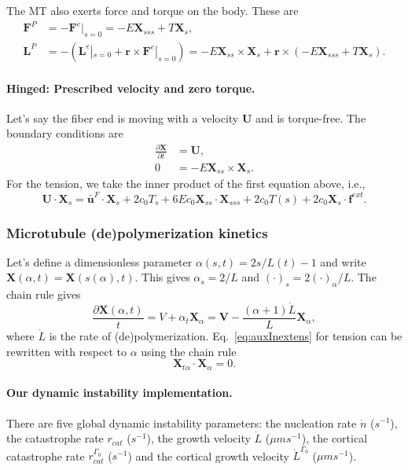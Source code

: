 \documentclass{article}
\newcommand{\UU}{\mathbf{U}}
\newcommand{\XX}{\mathbf{X}}
\newcommand{\ubarF}{\bar{\mathbf{u}}^F}
\newcommand{\ff}{\mathbf{f}}
\newcommand{\FF}{\mathbf{F}}
\newcommand{\VV}{\mathbf{V}}
\newcommand{\LL}{\mathbf{L}}
\begin{document}
The MT also exerts force and torque on the body. These are
\begin{align}
\FF^P & = -\FF^{e}|_{s = 0}  = -E\XX_{sss} + T\XX_s, \\
\LL^P & = -(\LL^{e}|_{s = 0} + \mathbf{r} \times \FF^{e}|_{s = 0}) = -E\XX_{ss} \times \XX_{s} + \mathbf{r} \times (-E\XX_{sss} + T\XX_s).
\end{align}

\paragraph{Hinged: Prescribed velocity and zero torque.}
Let's say the fiber end is moving with a velocity $\UU$ and is torque-free. The boundary conditions are
\begin{align}
\frac{\partial \XX}{\partial t}  & = \UU, \\
0 & = -E\XX_{ss} \times \XX_s.
\end{align}
For the tension, we take the inner product of the first equation above, i.e.,
\begin{equation}
\UU \cdot \XX_s = \ubarF \cdot \XX_s + 2c_0T_s + 6Ec_0\XX_{ss} \cdot \XX_{sss} + 2c_0 T(s) + 2c_0 \XX_s \cdot \ff^{ext}.
\end{equation}

\subsubsection{Microtubule (de)polymerization kinetics}
Let's define a dimensionless parameter $\alpha(s,t) = 2s/L(t) - 1$ and write $\XX(\alpha, t) = \XX(s(\alpha),t)$. This gives $\alpha_s = 2/L$ and $(\cdot)_s = 2(\cdot)_{\alpha}/L$. The chain rule gives
\begin{equation}
    \frac{\partial \XX(\alpha,t)}{t} = V + \alpha_t \XX_{\alpha} = \VV - \frac{(\alpha+1)\dot{L}}{L}\XX_{\alpha},
\end{equation}
where $\dot{L}$ is the rate of (de)polymerization. Eq.~\ref{eq:auxInextens} for tension can be rewritten with respect to $\alpha$ using the chain rule
\begin{equation}
    \XX_{t\alpha}\cdot\XX_{\alpha} = 0.
\end{equation}

\paragraph*{Our dynamic instability implementation.}
There are five global dynamic instability parameters: the nucleation rate $\dot{n}$ ($s^{-1}$), the catastrophe rate $r_{cat}$ ($s^{-1}$), the growth velocity $\dot{L}$ ($\mu m s^{-1}$), the cortical catastrophe rate $r_{cat}^{\Gamma_0}$ ($s^{-1}$) and the cortical growth velocity $\dot{L}^{\Gamma_0}$ ($\mu m s^{-1}$).
\end{document}
